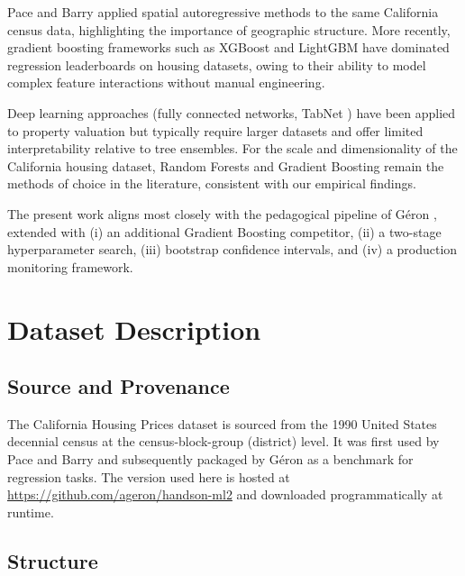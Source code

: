 \documentclass[conference]{IEEEtran}
\begin{document}
Pace and Barry \cite{pace1997} applied spatial autoregressive methods to the same California census data, highlighting the importance of geographic structure. More recently, gradient boosting frameworks such as XGBoost \cite{chen2016xgboost} and LightGBM have dominated regression leaderboards on housing datasets, owing to their ability to model complex feature interactions without manual engineering.

Deep learning approaches (fully connected networks, TabNet \cite{arik2021tabnet}) have been applied to property valuation but typically require larger datasets and offer limited interpretability relative to tree ensembles. For the scale and dimensionality of the California housing dataset, Random Forests and Gradient Boosting remain the methods of choice in the literature, consistent with our empirical findings.

The present work aligns most closely with the pedagogical pipeline of Géron \cite{geron2019}, extended with (i) an additional Gradient Boosting competitor, (ii) a two-stage hyperparameter search, (iii) bootstrap confidence intervals, and (iv) a production monitoring framework.

\section{Dataset Description}
\label{sec:dataset}

\subsection{Source and Provenance}

The California Housing Prices dataset is sourced from the 1990 United States decennial census at the census-block-group (district) level. It was first used by Pace and Barry \cite{pace1997} and subsequently packaged by Géron \cite{geron2019} as a benchmark for regression tasks. The version used here is hosted at \url{https://github.com/ageron/handson-ml2} and downloaded programmatically at runtime.

\subsection{Structure}
\end{document}
